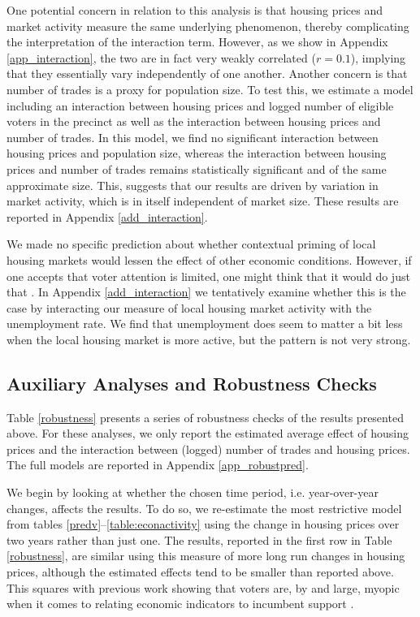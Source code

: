 \documentclass[12pt,a4paper]{article}
\begin{document}
	
	One potential concern in relation to this analysis is that housing prices and market activity measure the same underlying phenomenon, thereby complicating the interpretation of the interaction term. However, as we show in Appendix \ref{app_interaction}, the two are in fact very weakly correlated ($r=0.1$), implying that they essentially vary independently of one another. Another concern is that number of trades is a proxy for population size. To test this, we estimate a model including an interaction between housing prices and logged number of eligible voters in the precinct as well as the interaction between housing prices and number of trades. In this model, we find no significant interaction between housing prices and population size, whereas the interaction between housing prices and number of trades remains statistically significant and of the same approximate size. This, suggests that our results are driven by variation in market activity, which is in itself independent of market size. These results are reported in Appendix \ref{add_interaction}.
	
	We made no specific prediction about whether contextual priming of local housing markets would lessen the effect of other economic conditions. However, if one accepts that voter attention is limited, one might think that it would do just that \citep[this is a common assertion in the broader priming literature, see for instance][]{krosnick1990altering}. In Appendix \ref{add_interaction} we tentatively examine whether this is the case by interacting our measure of local housing market activity with the unemployment rate. We find that unemployment does seem to matter a bit less when the local housing market is more active, but the pattern is not very strong. 
	
	\subsection{Auxiliary Analyses and Robustness Checks}
	Table \ref{robustness} presents a series of robustness checks of the results presented above. For these analyses, we only report the estimated average effect of housing prices and the interaction between (logged) number of trades and housing prices. The full models are reported in Appendix \ref{app_robustpred}.
	
	
	
	We begin by looking at whether the chosen time period, i.e. year-over-year changes, affects the results. To do so, we re-estimate the most restrictive model from tables \ref{predv}--\ref{table:econactivity} using the change in housing prices over two years rather than just one. The results, reported in the first row in Table \ref{robustness}, are similar using this measure of more long run changes in housing prices, although the estimated effects tend to be smaller than reported above. This squares with previous work showing that voters are, by and large, myopic when it comes to relating economic indicators to incumbent support \citep{healy2009myopic,healy2014substituting}.
	
\end{document}
